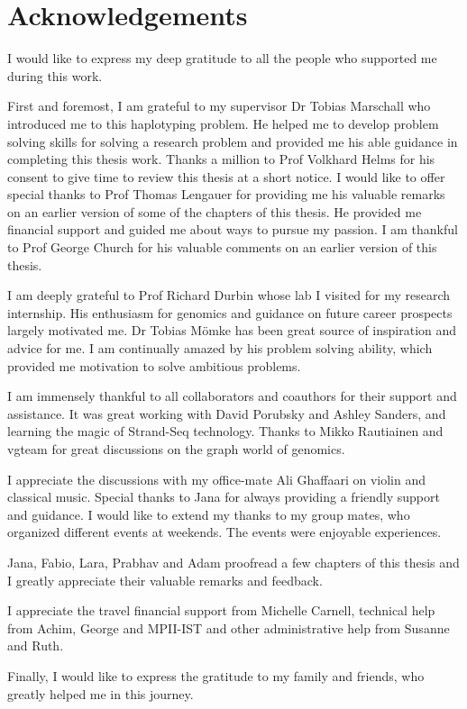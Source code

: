 \chapter*{Acknowledgements}

I would like to express my deep gratitude to all the people who supported me during this work.

First and foremost, I am grateful to my supervisor Dr Tobias Marschall who introduced me to this haplotyping problem.
He helped me to develop problem solving skills for solving a research problem
and provided me his able guidance in completing this thesis work. 
Thanks a million to Prof Volkhard Helms for his consent to give time to review this thesis at a short notice.
I would like to offer special thanks to Prof Thomas Lengauer for providing me his valuable remarks on an earlier version of some of the chapters of this thesis.
He provided me financial support and guided me about ways to pursue my passion.
I am thankful to Prof George Church for his valuable comments on an earlier version of this thesis.

I am deeply grateful to Prof Richard Durbin whose lab I visited for my research internship.
His enthusiasm for genomics and guidance on future career prospects largely motivated me.
Dr Tobias Mömke has been great source of inspiration and advice for me.
I am continually amazed by his problem solving ability, which provided me motivation to solve ambitious problems.

I am immensely thankful to all collaborators and coauthors for their support and assistance.
It was great working with David Porubsky and Ashley Sanders, and learning the magic of Strand-Seq technology.
Thanks to Mikko Rautiainen and vgteam for great discussions on the graph world of genomics.

I appreciate the discussions with my office-mate Ali Ghaffaari on violin and classical music.
Special thanks to Jana for always providing a friendly support and guidance.
I would like to extend my thanks to my group mates, who organized different events at weekends. The events were enjoyable experiences.

Jana, Fabio, Lara, Prabhav and Adam proofread a few chapters of this thesis and I greatly appreciate their valuable remarks and feedback.

I appreciate the travel financial support from Michelle Carnell, technical help from Achim, George and MPII-IST and other administrative help from Susanne and Ruth.  

Finally, I would like to express the gratitude to my family and friends, who greatly helped me in this journey.





